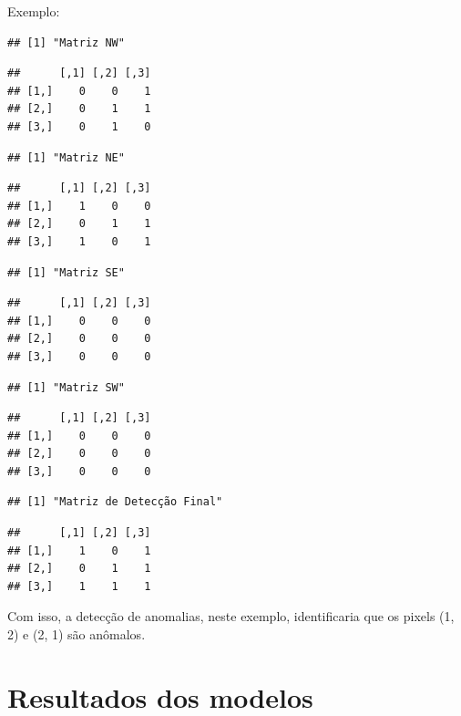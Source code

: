 \documentclass[
]{article}
\begin{document}
Exemplo:

\begin{verbatim}
## [1] "Matriz NW"
\end{verbatim}

\begin{verbatim}
##      [,1] [,2] [,3]
## [1,]    0    0    1
## [2,]    0    1    1
## [3,]    0    1    0
\end{verbatim}

\begin{verbatim}
## [1] "Matriz NE"
\end{verbatim}

\begin{verbatim}
##      [,1] [,2] [,3]
## [1,]    1    0    0
## [2,]    0    1    1
## [3,]    1    0    1
\end{verbatim}

\begin{verbatim}
## [1] "Matriz SE"
\end{verbatim}

\begin{verbatim}
##      [,1] [,2] [,3]
## [1,]    0    0    0
## [2,]    0    0    0
## [3,]    0    0    0
\end{verbatim}

\begin{verbatim}
## [1] "Matriz SW"
\end{verbatim}

\begin{verbatim}
##      [,1] [,2] [,3]
## [1,]    0    0    0
## [2,]    0    0    0
## [3,]    0    0    0
\end{verbatim}

\begin{verbatim}
## [1] "Matriz de Detecção Final"
\end{verbatim}

\begin{verbatim}
##      [,1] [,2] [,3]
## [1,]    1    0    1
## [2,]    0    1    1
## [3,]    1    1    1
\end{verbatim}

Com isso, a detecção de anomalias, neste exemplo, identificaria que os pixels (1, 2) e (2, 1) são anômalos.

\hypertarget{resultados-dos-modelos}{%
\section{Resultados dos modelos}\label{resultados-dos-modelos}}
\end{document}
